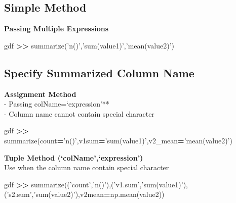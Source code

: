 \documentclass[
]{book}
\newenvironment{Shaded}{\begin{snugshade}}{\end{snugshade}}
\newcommand{\NormalTok}[1]{#1}
\newcommand{\OperatorTok}[1]{\textcolor[rgb]{0.43,0.43,0.43}{\textbf{#1}}}
\newcommand{\StringTok}[1]{\textcolor[rgb]{0.5,0.5,0.5}{#1}}
\begin{document}
\hypertarget{simple-method}{%
\subsection{Simple Method}\label{simple-method}}

\textbf{Passing Multiple Expressions}

\begin{Shaded}
\begin{Highlighting}[]
\NormalTok{gdf }\OperatorTok{>>}\NormalTok{ summarize(}\StringTok{'n()'}\NormalTok{,}\StringTok{'sum(value1)'}\NormalTok{,}\StringTok{'mean(value2)'}\NormalTok{)}
\end{Highlighting}
\end{Shaded}

\hypertarget{specify-summarized-column-name}{%
\subsection{Specify Summarized Column Name}\label{specify-summarized-column-name}}

\textbf{Assignment Method}\\
- Passing colName=`expression'**\\
- Column name cannot contain special character

\begin{Shaded}
\begin{Highlighting}[]
\NormalTok{gdf }\OperatorTok{>>}\NormalTok{ summarize(count}\OperatorTok{=}\StringTok{'n()'}\NormalTok{,v1sum}\OperatorTok{=}\StringTok{'sum(value1)'}\NormalTok{,v2_mean}\OperatorTok{=}\StringTok{'mean(value2)'}\NormalTok{)}
\end{Highlighting}
\end{Shaded}

\textbf{Tuple Method (`colName',`expression')}\\
Use when the column name contain special character

\begin{Shaded}
\begin{Highlighting}[]
\NormalTok{gdf }\OperatorTok{>>}\NormalTok{ summarize((}\StringTok{'count'}\NormalTok{,}\StringTok{'n()'}\NormalTok{),(}\StringTok{'v1.sum'}\NormalTok{,}\StringTok{'sum(value1)'}\NormalTok{),(}\StringTok{'s2.sum'}\NormalTok{,}\StringTok{'sum(value2)'}\NormalTok{),v2mean}\OperatorTok{=}\NormalTok{np.mean(value2))}
\end{Highlighting}
\end{Shaded}
\end{document}
